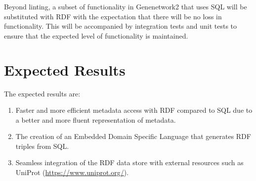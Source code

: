 Beyond linting, a subset of functionality in Genenetwork2 that uses SQL will be substituted with RDF with the expectation that there will be no loss in functionality.  This will be accompanied by integration tests and unit tests to ensure that the expected level of functionality is maintained.

\section{Expected Results}
The expected results are:

\begin{enumerate}

\item Faster and more efficient metadata access with RDF compared to SQL due to a better and more fluent representation of metadata.

\item The creation of an Embedded Domain Specific Language that generates RDF triples from SQL.

\item Seamless integration of the RDF data store with external resources such as UniProt (\url{https://www.uniprot.org/}).
\end{enumerate}
